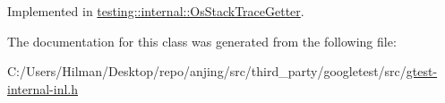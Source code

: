 Implemented in \hyperlink{classtesting_1_1internal_1_1_os_stack_trace_getter_abdfefeba8ffb0f1031491e4bd1a7fad9}{testing\+::internal\+::\+Os\+Stack\+Trace\+Getter}.



The documentation for this class was generated from the following file\+:\begin{DoxyCompactItemize}
\item 
C\+:/\+Users/\+Hilman/\+Desktop/repo/anjing/src/third\+\_\+party/googletest/src/\hyperlink{gtest-internal-inl_8h}{gtest-\/internal-\/inl.\+h}\end{DoxyCompactItemize}
